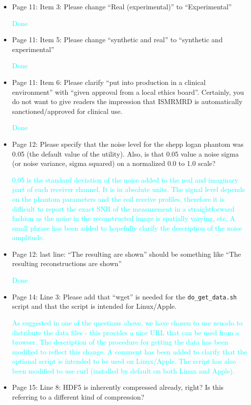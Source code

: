 \documentclass[12pt, draft]{article}
\makeatletter
\def\namedlabel#1#2{\begingroup#2\def\@currentlabel{#2}\phantomsection\label{#1}\endgroup}
\newcommand{\question}[1]{\item[\namedlabel{q#1}{#1}]}
\newcommand{\response}[1]{\textcolor{cyan}{#1}}
\makeatother
\begin{document}
{\begin{itemize}
\response{Done}

\question{R2.21} Page 11: Item 3: Please change ``Real (experimental)'' to ``Experimental''

\response{Done}

\question{R2.22} Page 11: Item 5: Please change ``synthetic and real'' to ``synthetic and experimental''

\response{Done}

\question{R2.23} Page 11: Item 6: Please clarify ``put into production in a clinical environment'' with ``given approval from a local ethics board''. Certainly, you do not want to give readers the impression that ISMRMRD is automatically sanctioned/approved for clinical use.

\response{Done}

\question{R2.24} Page 12: Please specify that the noise level for the shepp logan phantom was 0.05 (the default value of the utility). Also, is that 0.05 value a noise sigma (or noise variance, sigma squared) on a normalized 0.0 to 1.0 scale?

\response{0.05 is the standard deviation of the noise added to the real and imaginary part of each receiver channel.  It is in absolute units.  The signal level depends on the phantom parameters and the coil receive profiles, therefore it is difficult to report the exact SNR of the measurement in a straightforward fashion as the noise in the reconstructed image is spatially varying, etc.  A small phrase has been added to hopefully clarify the description of the noise amplitude.}

\question{R2.25} Page 12: last line: ``The resulting are shown'' should be something like ``The resulting reconstructions are shown''

\response{Done}

\question{R2.26} Page 14: Line 3: Please add that ``wget'' is needed for the \texttt{do\_get\_data.sh} script and that the script is intended for Linux/Apple.

\response{As suggested in one of the questions above, we have chosen to use zenodo to distribute the data files - this provides a nice URL that can be used from a browser.  The description of the procedure for getting the data has been modified to reflect this change.  A comment has been added to clarify that the optional script is intended to be used on Linux/Apple.  The script has also been modified to use curl (installed by default on both Linux and Apple).}

\question{R2.27} Page 15: Line 8: HDF5 is inherently compressed already, right? Is this referring to a different kind of compression?


\end{itemize}}
\end{document}
